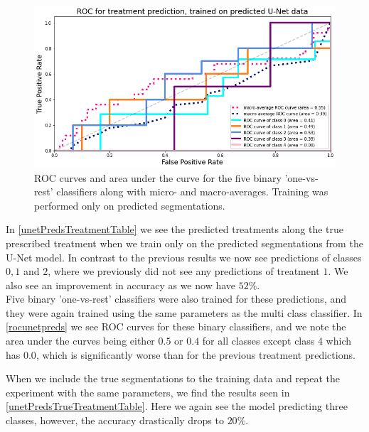 \begin{figure}[H]
	\centering
	\includegraphics[width=0.85\linewidth]{Materials/Results/UNet/UNetROC1}
	\caption{ROC curves and area under the curve for the five binary 'one-vs-rest' classifiers along with micro- and macro-averages. Training was performed only on predicted segmentations.}
	\label{rocunetpreds}
\end{figure}
In \autoref{unetPredsTreatmentTable} we see the predicted treatments along the true prescribed treatment when we train only on the predicted segmentations from the U-Net model. In contrast to the previous results we now see predictions of classes $0, 1$ and $2$, where we previously did not see any predictions of treatment $1$. We also see an improvement in accuracy as we now have $52\%$.\\
Five binary 'one-vs-rest' classifiers were also trained for these predictions, and they were again trained using the same parameters as the multi class classifier. In \autoref{rocunetpreds} we see ROC curves for these binary classifiers, and we note the area under the curves being either $0.5$ or $0.4$ for all classes except class 4 which has $0.0$, which is significantly worse than for the previous treatment predictions.

When we include the true segmentations to the training data and repeat the experiment with the same parameters, we find the results seen in \autoref{unetPredsTrueTreatmentTable}. Here we again see the model predicting three classes, however, the accuracy drastically drops to $20\%$.

